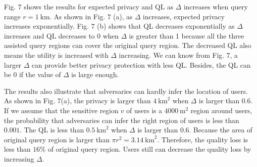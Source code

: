 \documentclass[a4paper,fleqn]{cas-dc}
\begin{document}
Fig. 7 shows the results for expected privacy and $\mathrm{QL}$ as $\Delta$ increases when query range $r=1 \mathrm{~km}$. As shown in Fig. 7 (a), as $\Delta$ increases, expected privacy increases exponentially. Fig. 7 (b) shows that QL decreases exponentially as $\Delta$ increases and $\mathrm{QL}$ decreases to 0 when $\Delta$ is greater than 1 because all the three assisted query regions can cover the original query region. The decreased QL also means the utility is increased with $\Delta$ increasing. We can know from Fig. 7, a larger $\Delta$ can provide better privacy protection with less QL. Besides, the QL can be 0 if the value of $\Delta$ is large enough.

The results also illustrate that adversaries can hardly infer the location of users. As shown in Fig. 7(a), the privacy is larger than $4 \mathrm{~km}^{2}$ when $\Delta$ is larger than $0.6$. If we assume that the sensitive region $v$ of users is a $4000 \mathrm{~m}^{2}$ region around users, the probability that adversaries can infer the right region of users is less than $0.001$. The $\mathrm{QL}$ is less than $0.5 \mathrm{~km}^{2}$ when $\Delta$ is larger than 0.6. Because the area of original query region is larger than $\pi r^{2}=3.14 \mathrm{~km}^{2}$. Therefore, the quality loss is less than $16 \%$ of original query region. Users still can decrease the quality loss by increasing $\Delta$.
\end{document}
